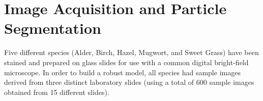\section{Image Acquisition and Particle Segmentation}

Five different species (Alder, Birch, Hazel, Mugwort, and Sweet Grass) have been stained and prepared on glass slides for use with a common digital bright-field microscope. In order to build a robust model, all species had sample images derived from three distinct laboratory slides (using a total of 600 sample images obtained from 15 different slides).
  
  
  
  
  
  
  